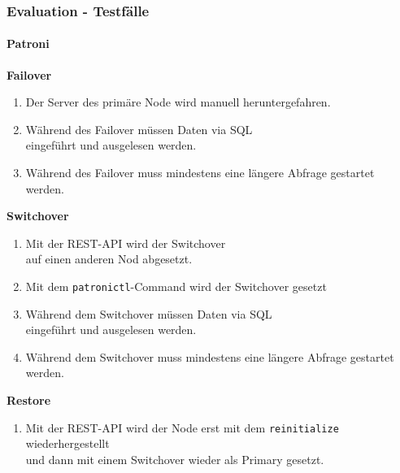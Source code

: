 
\begin{flushleft}
    \subsubsection{Evaluation - Testfälle}
    \paragraph{Patroni}
    \begin{description}
        \item \textbf{Failover}\hfill \\
        \begin{enumerate}
            \item Der Server des primäre Node wird manuell heruntergefahren.
            \item Während des Failover müssen Daten via SQL\\eingeführt und ausgelesen werden.
            \item Während des Failover muss mindestens eine längere Abfrage gestartet werden.
        \end{enumerate}
        \item \textbf{Switchover}\hfill \\
        \begin{enumerate}[resume]
            \item Mit der REST-API wird der Switchover\\auf einen anderen Nod abgesetzt.
            \item Mit dem \texttt{patronictl}-Command wird der Switchover gesetzt
            \item Während dem Switchover müssen Daten via SQL\\eingeführt und ausgelesen werden.
            \item Während dem Switchover muss mindestens eine längere Abfrage gestartet werden.
        \end{enumerate}
        \item \textbf{Restore}\hfill \\
        \begin{enumerate}[resume]
            \item Mit der REST-API wird der Node erst mit dem \texttt{reinitialize} wiederhergestellt\\und dann mit einem Switchover wieder als Primary gesetzt.

\end{enumerate}
\end{description}
\end{flushleft}
